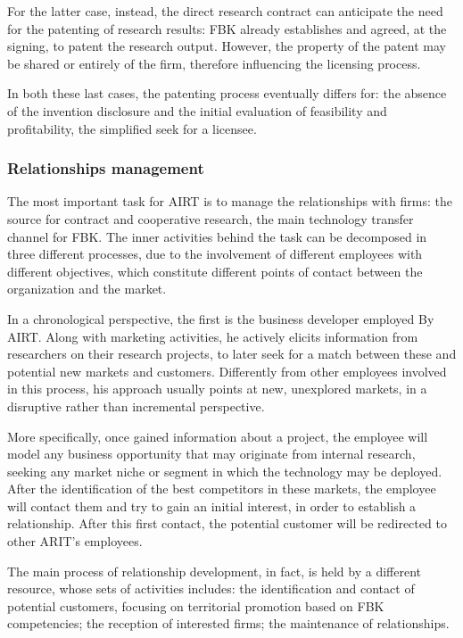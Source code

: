 For the latter case, instead, the direct research contract can anticipate the need for the patenting of research results: FBK already establishes and agreed, at the signing, to patent the research output. However, the property of the patent may be shared or entirely of the firm, therefore influencing the licensing process.

In both these last cases, the patenting process eventually differs for: the absence of the invention disclosure and the initial evaluation of feasibility and profitability, the simplified seek for a licensee.

\subsubsection{Relationships management}

The most important task for AIRT is to manage the relationships with firms: the source for contract and cooperative research, the main technology transfer channel for FBK. The inner activities behind the task can be decomposed in three different processes, due to the involvement of different employees with different objectives, which constitute different points of contact between the organization and the market.

In a chronological perspective, the first is the business developer employed By AIRT. Along with marketing activities, he actively elicits information from researchers on their research projects, to later seek for a match between these and potential new markets and customers. Differently from other employees involved in this process, his approach usually points at new, unexplored markets, in a disruptive rather than incremental perspective. 

More specifically, once gained information about a project, the employee will model any business opportunity that may originate from internal research, seeking any market niche or segment in which the technology may be deployed. After the identification of the best competitors in these markets, the employee will contact them and try to gain an initial interest, in order to establish a relationship. After this first contact, the potential customer will be redirected to other ARIT's employees. 

The main process of relationship development, in fact, is held by a different resource, whose sets of activities includes: the identification and contact of potential customers, focusing on territorial promotion based on FBK competencies; the reception of interested firms; the maintenance of relationships. 


